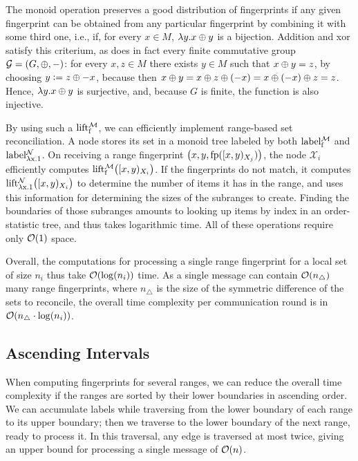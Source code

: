 \documentclass[conference]{IEEEtran}
\newcommand{\peer}[1]{\ensuremath{\mathcal{X}_{#1}}}
\begin{document}
The monoid operation preserves a good distribution of fingerprints if any given fingerprint can be obtained from any particular fingerprint by combining it with some third one, i.e., if, for every $x \in M$, $\lambda y.x \oplus y$ is a bijection. Addition and xor satisfy this criterium, as does in fact every finite commutative group $\mathcal{G} = (G, \oplus, -)$: for every $x, z \in M$ there exists $y \in M$ such that $x \oplus y = z$, by choosing $y \vcentcolon= z \oplus -x$, because then $x \oplus y = x \oplus z \oplus (-x) = x \oplus (-x) \oplus z = z$. Hence, $\lambda y.x \oplus y$ is surjective, and, because $G$ is finite, the function is also injective.

By using such a \somewhatmorphism{} $\operatorname{lift_{\operatorname{f}}^{\mathcal{M}}}$, we can efficiently implement range-based set reconciliation. A node stores its set in a monoid tree labeled by both $\operatorname{label_{\operatorname{f}}^{\mathcal{M}}}$ and $\operatorname{label_{\lambda x.1}^{\mathcal{N}}}$. On receiving a range fingerprint $\bigl({x}, {y}, {\operatorname{fp}([{x},{y})_{X_j})}\bigr)$, the node \peer{i} efficiently computes $\operatorname{lift_{\operatorname{f}}^{\mathcal{M}}}\bigl([{x},{y})_{X_i}\bigr)$. If the fingerprints do not match, it computes $\operatorname{lift_{\lambda x.1}^{\mathcal{N}}}\bigl([{x},{y})_{X_i}\bigr)$ to determine the number of items it has in the range, and uses this information for determining the sizes of the subranges to create. Finding the boundaries of those subranges amounts to looking up items by index in an order-statistic tree, and thus takes logarithmic time. All of these operations require only $\mathcal{O}(1)$ space.

Overall, the computations for processing a single range fingerprint for a local set of size $n_i$ thus take $\mathcal{O}(\log(n_i))$ time. As a single message can contain $\mathcal{O}(n_{\triangle})$ many range fingerprints, where $n_{\triangle}$ is the size of the symmetric difference of the sets to reconcile, the overall time complexity per communication round is in $\mathcal{O}(n_{\triangle} \cdot \log(n_i))$.

\subsection{Ascending Intervals}

When computing fingerprints for several ranges, we can reduce the overall time complexity if the ranges are sorted by their lower boundaries in ascending order. We can accumulate labels while traversing from the lower boundary of each range to its upper boundary; then we traverse to the lower boundary of the next range, ready to process it. In this traversal, any edge is traversed at most twice, giving an upper bound for processing a single message of $\mathcal{O}(n)$.
\end{document}
